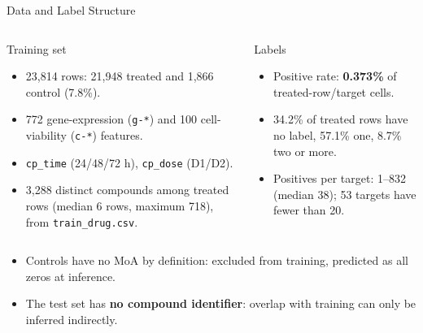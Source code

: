 \documentclass[aspectratio=169,10pt]{beamer}
\newcommand{\metric}[1]{\textcolor{MoATeal}{\textbf{#1}}}
\begin{document}
\begin{frame}{Data and Label Structure}
\begin{columns}[T,onlytextwidth]
\begin{block}{Training set}
\begin{itemize}
  \item 23,814 rows: 21,948 treated and 1,866 control (7.8\%).
  \item 772 gene-expression (\texttt{g-*}) and 100 cell-viability (\texttt{c-*}) features.
  \item \texttt{cp\_time} (24/48/72 h), \texttt{cp\_dose} (D1/D2).
  \item 3,288 distinct compounds among treated rows (median 6 rows, maximum 718), from \texttt{train\_drug.csv}.
\end{itemize}
\end{block}
\begin{block}{Labels}
\begin{itemize}
  \item Positive rate: \metric{0.373\%} of treated-row/target cells.
  \item 34.2\% of treated rows have no label, 57.1\% one, 8.7\% two or more.
  \item Positives per target: 1--832 (median 38); 53 targets have fewer than 20.
\end{itemize}
\end{block}
\end{columns}
\vspace{0.4em}
\begin{itemize}
  \item Controls have no MoA by definition: excluded from training, predicted as all zeros at inference.
  \item The test set has \textbf{no compound identifier}: overlap with training can only be inferred indirectly.
\end{itemize}
\end{frame}
\end{document}
